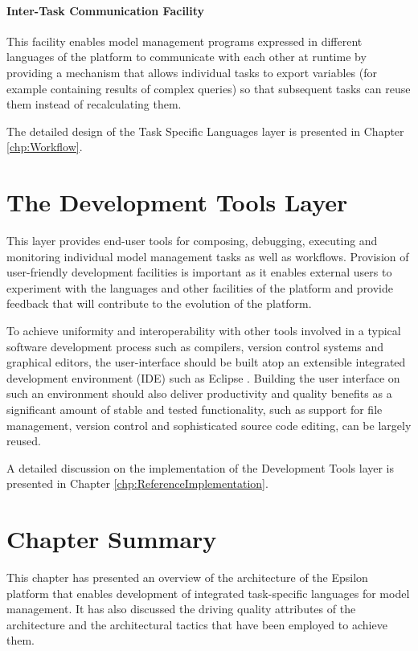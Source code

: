 \paragraph{Inter-Task Communication Facility} This facility enables model management programs expressed in different languages of the platform to communicate with each other at runtime by providing a mechanism that allows individual tasks to export variables (for example containing results of complex queries) so that subsequent tasks can reuse them instead of recalculating them.

\noindent The detailed design of the Task Specific Languages layer is presented in Chapter \ref{chp:Workflow}.

\section{The Development Tools Layer}
\label{sec:Architecture.DevelopmentTools}
This layer provides end-user tools for composing, debugging, executing and monitoring individual model management tasks as well as workflows. Provision of user-friendly development facilities is important as it enables external users to experiment with the languages and other facilities of the platform and provide feedback that will contribute to the evolution of the platform.

To achieve uniformity and interoperability with other tools involved in a typical software development process such as compilers, version control systems and graphical editors, the  user-interface should be built atop an extensible integrated development environment (IDE) such as Eclipse \cite{Eclipse}. Building the user interface on such an environment should also deliver productivity and quality benefits as a significant amount of stable and tested functionality, such as support for file management, version control and sophisticated source code editing, can be largely reused.

A detailed discussion on the implementation of the Development Tools layer is presented in Chapter \ref{chp:ReferenceImplementation}.

\section{Chapter Summary}
\label{sec:Architecture.Summary}

This chapter has presented an overview of the architecture of the Epsilon platform that enables development of integrated task-specific languages for model management. It has also discussed the driving quality attributes of the architecture and the architectural tactics that have been employed to achieve them. 

